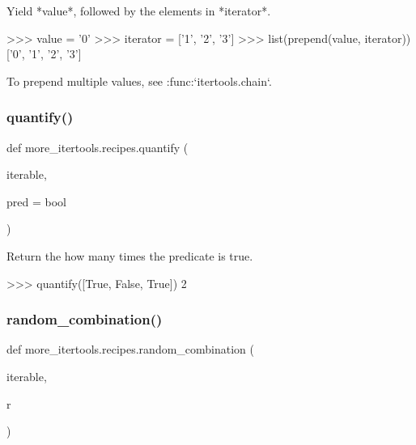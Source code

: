 \begin{DoxyVerb}Yield *value*, followed by the elements in *iterator*.

    >>> value = '0'
    >>> iterator = ['1', '2', '3']
    >>> list(prepend(value, iterator))
    ['0', '1', '2', '3']

To prepend multiple values, see :func:`itertools.chain`.\end{DoxyVerb}
 \mbox{\label{namespacemore__itertools_1_1recipes_a6be608968636cbc9c86ae22dfafa2084}} 
\subsubsection{\texorpdfstring{quantify()}{quantify()}}
{\footnotesize\ttfamily def more\+\_\+itertools.\+recipes.\+quantify (\begin{DoxyParamCaption}\item[{}]{iterable,  }\item[{}]{pred = {\ttfamily bool} }\end{DoxyParamCaption})}

\begin{DoxyVerb}Return the how many times the predicate is true.

    >>> quantify([True, False, True])
    2\end{DoxyVerb}
 \mbox{\label{namespacemore__itertools_1_1recipes_a024a1437cf49722d56bdfda6a965574e}} 
\subsubsection{\texorpdfstring{random\+\_\+combination()}{random\_combination()}}
{\footnotesize\ttfamily def more\+\_\+itertools.\+recipes.\+random\+\_\+combination (\begin{DoxyParamCaption}\item[{}]{iterable,  }\item[{}]{r }\end{DoxyParamCaption})}

